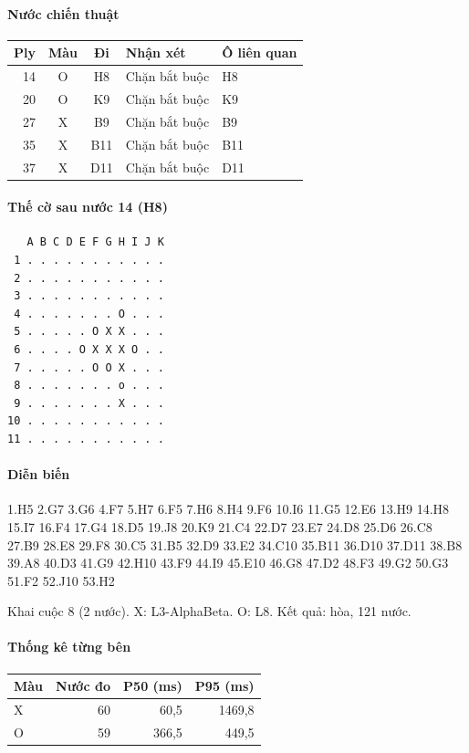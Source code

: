 \paragraph{Nước chiến thuật}
\begin{center}\small
\begin{tabular}{@{}rccll@{}}
\toprule
Ply & Màu & Đi & Nhận xét & Ô liên quan \\
\midrule
14 & O & H8 & Chặn bắt buộc & H8 \\
20 & O & K9 & Chặn bắt buộc & K9 \\
27 & X & B9 & Chặn bắt buộc & B9 \\
35 & X & B11 & Chặn bắt buộc & B11 \\
37 & X & D11 & Chặn bắt buộc & D11 \\
\bottomrule
\end{tabular}
\end{center}
\paragraph{Thế cờ sau nước 14 (H8)}
\begin{verbatim}
   A B C D E F G H I J K
 1 . . . . . . . . . . .
 2 . . . . . . . . . . .
 3 . . . . . . . . . . .
 4 . . . . . . . O . . .
 5 . . . . . O X X . . .
 6 . . . . O X X X O . .
 7 . . . . . O O X . . .
 8 . . . . . . . o . . .
 9 . . . . . . . X . . .
10 . . . . . . . . . . .
11 . . . . . . . . . . .
\end{verbatim}
\paragraph{Diễn biến}
{\footnotesize 1.H5 2.G7 3.G6 4.F7 5.H7 6.F5 7.H6 8.H4 9.F6 10.I6 11.G5 12.E6 13.H9 14.H8 15.I7 16.F4 17.G4 18.D5 19.J8 20.K9 21.C4 22.D7 23.E7 24.D8 25.D6 26.C8 27.B9 28.E8 29.F8 30.C5 31.B5 32.D9 33.E2 34.C10 35.B11 36.D10 37.D11 38.B8 39.A8 40.D3 41.G9 42.H10 43.F9 44.I9 45.E10 46.G8 47.D2 48.F3 49.G2 50.G3 51.F2 52.J10 53.H2\par}
Khai cuộc 8 (2 nước). X: L3-AlphaBeta. O: L8. Kết quả: hòa, 121 nước.
\paragraph{Thống kê từng bên}
\begin{center}\small
\begin{tabular}{@{}lrrr@{}}
\toprule
Màu & Nước đo & P50 (ms) & P95 (ms) \\
\midrule
X & 60 & 60,5 & 1469,8 \\
O & 59 & 366,5 & 449,5 \\
\bottomrule
\end{tabular}
\end{center}
